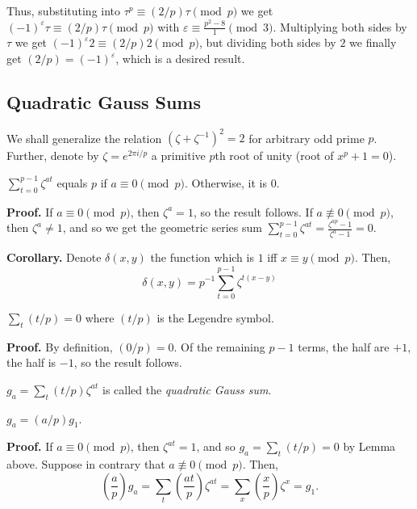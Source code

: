 \documentclass{template}
\begin{document}
Thus, substituting into $\tau^p \equiv (2/p)\tau \pmod{p}$ we get
$(-1)^{\varepsilon}\tau \equiv (2/p)\tau \pmod{p}$ with $\varepsilon \equiv
\frac{p^2-8}{1} \pmod{3}$. Multiplying both sides by $\tau$ we get
$(-1)^{\varepsilon}2 \equiv (2/p)2 \pmod{p}$, but dividing both sides by $2$ we
finally get $(2/p)=(-1)^{\varepsilon}$, which is a desired result.

\subsection{Quadratic Gauss Sums}

We shall generalize the relation $(\zeta+\zeta^{-1})^2=2$ for arbitrary odd
prime $p$. Further, denote by $\zeta=e^{2\pi i/p}$ a primitive $p$th root of
unity (root of $x^p+1=0$).

\begin{lemma}
    $\sum_{t=0}^{p-1}\zeta^{at}$ equals $p$ if $a \equiv 0 \pmod{p}$. Otherwise, it is $0$.
\end{lemma}

\textbf{Proof.} If $a \equiv 0 \pmod{p}$, then $\zeta^a=1$, so the result
follows. If $a \not\equiv 0 \pmod{p}$, then $\zeta^a \neq 1$, and so we get the
geometric series sum $\sum_{t=0}^{p-1}\zeta^{at} =
\frac{\zeta^{ap}-1}{\zeta^a-1}=0$.

\textbf{Corollary.} Denote $\delta(x,y)$ the function which is $1$ iff $x \equiv
y \pmod{p}$. Then,
\begin{equation*}
    \delta(x,y) = p^{-1}\sum_{t=0}^{p-1}\zeta^{t(x-y)}
\end{equation*}

\begin{lemma}
    $\sum_t (t/p)=0$ where $(t/p)$ is the Legendre symbol.
\end{lemma}

\textbf{Proof.} By definition, $(0/p)=0$. Of the remaining $p-1$ terms, the half
are $+1$, the half is $-1$, so the result follows.

\begin{definition}
    $g_a = \sum_t (t/p)\zeta^{at}$ is called the \textit{quadratic Gauss sum}.
\end{definition}

\begin{proposition}
    $g_a = (a/p)g_1$.
\end{proposition}

\textbf{Proof.} If $a \equiv 0 \pmod{p}$, then $\zeta^{at}=1$, and so $g_a =
\sum_t (t/p) = 0$ by Lemma above. Suppose in contrary that $a \not\equiv 0
\pmod{p}$. Then,
\begin{equation*}
    \left(\frac{a}{p}\right)g_a = \sum_t \left(\frac{at}{p}\right)\zeta^{at} = \sum_x \left(\frac{x}{p}\right)\zeta^x = g_1.
\end{equation*}
\end{document}
